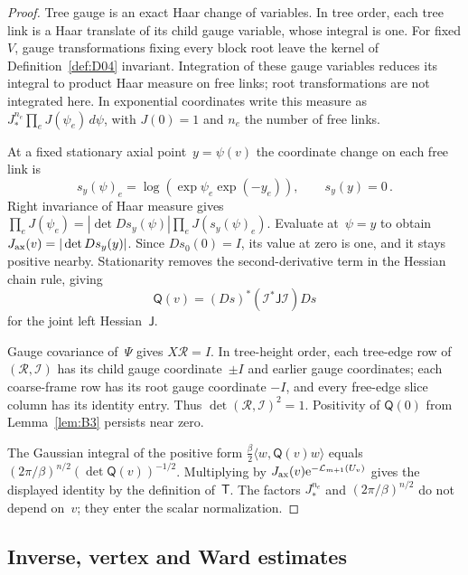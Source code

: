 \begin{proof}
Tree gauge is an exact Haar change of variables. In tree order, each tree link is a Haar translate of its child gauge variable, whose integral is one. For fixed $V$, gauge transformations fixing every block root leave the kernel of Definition~\ref{def:D04} invariant. Integration of these gauge variables reduces its integral to product Haar measure on free links; root transformations are not integrated here. In exponential coordinates write this measure as $J_*^{n_e}\prod_eJ(\psi_e)\,d\psi$, with $J(0)=1$ and $n_e$ the number of free links.

At a fixed stationary axial point~$y=\psi(v)$ the coordinate change on each free link is
\begin{equation*}
s_y(\psi)_e=\log(\exp \psi_e\exp(-y_e)),\qquad s_y(y)=0\,.
\end{equation*}
Right invariance of Haar measure gives $\prod_eJ(\psi_e)=|\det Ds_y(\psi)|\prod_eJ(s_y(\psi)_e)$. Evaluate at~$\psi=y$ to obtain $J_{\rm ax}(v)=|\det Ds_y(y)|$. Since $Ds_0(0)=I$, its value at zero is one, and it stays positive nearby. Stationarity removes the second-derivative term in the Hessian chain rule, giving
\begin{equation}\label{eq:B-hessian-chain}
\mathsf Q(v)=(Ds)^*(\mathcal I^*\mathsf J\mathcal I)Ds
\end{equation}
for the joint left Hessian~$\mathsf J$.

Gauge covariance of~$\Psi$ gives $X\mathcal R=I$. In tree-height order, each tree-edge row of~$(\mathcal R,\mathcal I)$ has its child gauge coordinate~$\pm I$ and earlier gauge coordinates; each coarse-frame row has its root gauge coordinate $-I$, and every free-edge slice column has its identity entry. Thus $\det(\mathcal R,\mathcal I)^2=1$. Positivity of $\mathsf Q(0)$ from Lemma~\ref{lem:B3} persists near zero.

The Gaussian integral of the positive form $\frac\beta2\langle w,\mathsf Q(v)w\rangle$ equals $(2\pi/\beta)^{n/2}(\det\mathsf Q(v))^{-1/2}$. Multiplying by $J_{\rm ax}(v)\mathrm e^{-\mathcal L_{m+1}(U_v)}$ gives the displayed identity by the definition of~$\mathsf T$. The factors $J_*^{n_e}$ and $(2\pi/\beta)^{n/2}$ do not depend on~$v$; they enter the scalar normalization.
\end{proof}

\subsection{Inverse, vertex and Ward estimates}\label{subsec:B-inverse}

